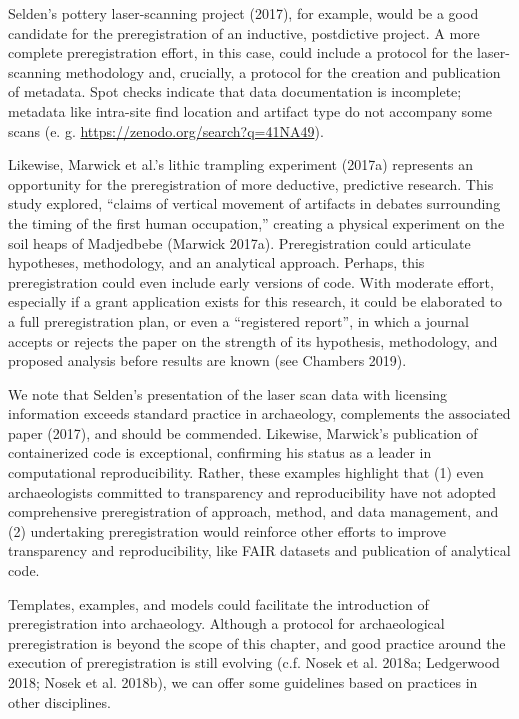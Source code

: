\documentclass[article]{sa}
\begin{document}
Selden's pottery laser-scanning project (2017), for example, would be a
good candidate for the preregistration of an inductive, postdictive
project. A more complete preregistration effort, in this case, could
include a protocol for the laser-scanning methodology and, crucially, a
protocol for the creation and publication of metadata. Spot checks
indicate that data documentation is incomplete; metadata like intra-site
find location and artifact type do not accompany some scans (e. g.
\href{https://zenodo.org/search?page=1\&size=20\&q=41NA49}{{https://zenodo.org/search?q=41NA49}}).

Likewise, Marwick et al.'s lithic trampling experiment (2017a)
represents an opportunity for the preregistration of more deductive,
predictive research. This study explored, ``claims of vertical movement
of artifacts in debates surrounding the timing of the first human
occupation,'' creating a physical experiment on the soil heaps of
Madjedbebe (Marwick 2017a). Preregistration could articulate hypotheses,
methodology, and an analytical approach. Perhaps, this preregistration
could even include early versions of code. With moderate effort,
especially if a grant application exists for this research, it could be
elaborated to a full preregistration plan, or even a ``registered
report'', in which a journal accepts or rejects the paper on the strength
of its hypothesis, methodology, and proposed analysis before results are
known (see Chambers 2019).

We note that Selden's presentation of the laser scan data with licensing
information exceeds standard practice in archaeology, complements the
associated paper (2017), and should be commended. Likewise, Marwick's
publication of containerized code is exceptional, confirming his status
as a leader in computational reproducibility. Rather, these examples
highlight that (1) even archaeologists committed to transparency and
reproducibility have not adopted comprehensive preregistration of
approach, method, and data management, and (2) undertaking
preregistration would reinforce other efforts to improve transparency
and reproducibility, like FAIR datasets and publication of analytical
code.

Templates, examples, and models could facilitate the introduction of
preregistration into archaeology. Although a protocol for archaeological
preregistration is beyond the scope of this chapter, and good practice
around the execution of preregistration is still evolving (c.f. Nosek et
al. 2018a; Ledgerwood 2018; Nosek et al. 2018b), we can offer some
guidelines based on practices in other disciplines.
\end{document}
